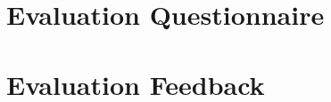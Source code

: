 \documentclass{l4proj}
\begin{document}
\begin{appendices}
  \chapter{Evaluation Questionnaire}
  \label{evaluation-questionnaire}
  
  \chapter{Evaluation Feedback}
  \label{evaluation-feedback}
  
\end{appendices}




\end{document}
